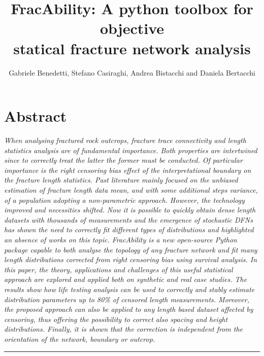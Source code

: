 \documentclass[11pt]{article}
\title{FracAbility: A python toolbox for objective \\statical fracture network analysis}
\author{Gabriele Benedetti, Stefano Casiraghi, Andrea Bistacchi and Daniela Bertacchi}
\date{}
\begin{document}
	\maketitle
	\section*{Abstract}
	\textit{When analysing fractured rock outcrops, fracture trace connectivity and length statistics analysis are of fundamental importance. Both properties are intertwined since to correctly treat the latter the former must be conducted. Of particular importance is the right censoring bias effect of the interpretational boundary on the fracture length statistics. Past literature mainly focused on the unbiased estimation of fracture length data mean, and with some additional steps variance, of a population adopting a non-parametric approach. However, the technology improved and necessities shifted. Now it is possible to quickly obtain dense length datasets with thousands of measurements and the emergence of stochastic DFNs has shown the need to correctly fit different types of distributions and highlighted an absence of works on this topic. 
	FracAbility is a new open-source Python package capable to both analyse the topology of any fracture network and fit many length distributions corrected from right censoring bias using survival analysis. In this paper, the theory, applications and challenges of this useful statistical approach are explored and applied both on synthetic and real case studies. The results show how life testing analysis can be used to correctly and stably estimate distribution parameters up to 80\% of censored length measurements. Moreover, the proposed approach can also be applied to any length based dataset affected by censoring, thus offering the possibility to correct also spacing and height distributions. Finally, it is shown that the correction is independent from the orientation of the network, boundary or outcrop.}
	\rule{\textwidth}{0.1mm}
\end{document}
